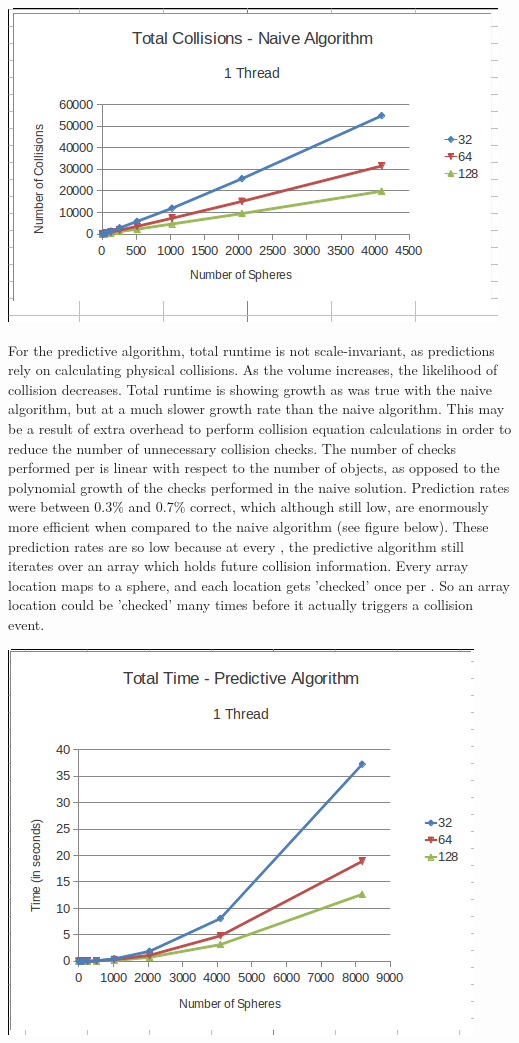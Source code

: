 \documentclass[conference]{IEEEtran}
\begin{document}
\begin{center}
	\includegraphics[width=.45\textwidth]{collisions_naive_1thread.png}
\end{center}

For the predictive algorithm, total runtime is not scale-invariant, as predictions rely on calculating physical collisions.  As the volume increases, the likelihood of collision decreases.  Total runtime is showing growth as was true with the naive algorithm, but at a much slower growth rate than the naive algorithm.  This may be a result of extra overhead to perform collision equation calculations in order to reduce the number of unnecessary collision checks.  The number of checks performed per  is linear with respect to the number of objects, as opposed to the polynomial growth of the checks performed in the naive solution.  Prediction rates were between 0.3\% and 0.7\% correct, which although still low, are enormously more efficient when compared to the naive algorithm (see figure below).  These prediction rates are so low because at every , the predictive algorithm still iterates over an array which holds future collision information.  Every array location maps to a sphere, and each location gets 'checked' once per .  So an array location could be 'checked' many times before it actually triggers a collision event.

\begin{center}
	\includegraphics[width=.45\textwidth]{runtime_predictive_1thread.png}
\end{center}
\end{document}
